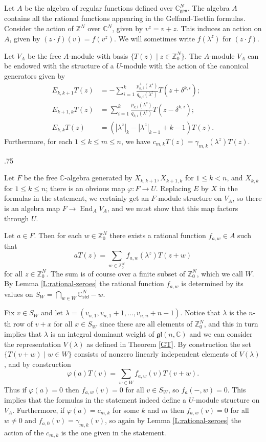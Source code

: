 \documentclass[11pt,fleqn]{article}
\makeatletter
\renewenvironment{proof}[1][\textit{Proof}]{\par
  \pushQED{\qed}%
  \normalfont \topsep.75\paraskip\relax
  \trivlist
  \item[\hskip\labelsep
        \itshape
    #1\@addpunct{.}]\ignorespaces
}{%
  \popQED\endtrivlist\@endpefalse
}
\newcommand\CC{\mathbb C}
\newcommand\ZZ{\mathbb Z}
\renewcommand\to{\longrightarrow}
\renewcommand\phi{\varphi}
\newcommand\gl{\mathfrak{gl}}
\newcommand\gen{\mathsf{gen}}
\newcommand\std{\mathsf{std}}
\DeclareMathOperator\End{End}
\makeatother
\begin{document}
Let $A$ be the algebra of regular functions defined over $\CC^N_\gen$. The 
algebra $A$ contains all the rational functions appearing in the 
Gelfand-Tsetlin formulas. Consider the action of $\ZZ^N$ over $\CC^N$, given 
by $v^z = v+z$. This induces an action on $A$, given by $(z \cdot f)(v) = 
f(v^z)$. We will sometimes write $f(\lambda^z)$ for $(z \cdot f)$. 

\begin{Proposition}
\label{P:universal-generic-GT-module}
Let $V_A$ be the free $A$-module with basis $\{T(z) \mid z \in \ZZ^N_0\}$.
The $A$-module $V_A$ can be endowed with the structure of a $U$-module 
with the action of the canonical generators given by
\begin{align*}
E_{k,k+1} T(z) 
	&= - \sum_{i=1}^k \frac{p^+_{k,i}(\lambda^z)}{q_{k,i}(\lambda^z)} 
		T(z + \delta^{k,i}); \\
E_{k+1,k} T(z) 
	&= \sum_{i=1}^k \frac{p^-_{k,i}(\lambda^z)}{q_{k,i}(\lambda^z)} 
		T(z - \delta^{k,i}); \\
E_{k,k} T(z)
	&= (|\lambda^z|_k - |\lambda^z|_{k-1} + k -1) T(z).
\end{align*}
Furthermore, for each $1 \leq k \leq m \leq n$, we have $c_{m,k} T(z) = 
\gamma_{m,k}(\lambda^z) T(z)$.
\end{Proposition}
\begin{proof}
Let $F$ be the free $\CC$-algebra generated by $X_{k,k+1}, X_{k+1,k}$ for 
$1 \leq k < n$, and $X_{k,k}$ for $1 \leq k \leq n$; there is an obvious map
$\phi: F \to U$. Replacing $E$ by $X$ in the formulas in the statement, we 
certainly get an $F$-module structure on $V_A$, so there is an algebra map $F 
\to \End_A V_A$, and we must show that this map factors through $U$.

Let $a \in F$. Then for each $w \in \ZZ^N_0$ there exists a rational function 
$f_{a,w} \in A$ such that
\[
	aT(z) = \sum_{w \in \ZZ^N_0} f_{a,w}(\lambda^z) T(z+w)
\]
for all $z \in \ZZ^N_0$. The sum is of course over a finite subset of 
$\ZZ^N_0$, which we call $W$. By Lemma \ref{L:rational-zeroes} the rational 
function $f_{a,w}$ is determined by its values on $S_W = \bigcap_{w \in W} 
\CC_\std^N-w$.

Fix $v \in S_W$ and let $\lambda = (v_{n,1}, v_{n,1} + 1, \ldots, v_{n,n} + 
n -1)$. Notice that $\lambda$ is the $n$-th row of $v+x$ for all $x \in S_W$ 
since these are all elements of $\ZZ^N_0$, and this in turn implies that 
$\lambda$ is an integral dominant weight of $\gl(n,\CC)$ and we can
consider the representation $V(\lambda)$ as defined in Theorem \ref{GT}. By 
construction the set $\{T(v+w) \mid w \in W\}$ consists of nonzero linearly 
independent elements of $V(\lambda)$, and by construction
\[
	\phi(a) T(v) = \sum_{w \in W} f_{a,w}(v) T(v+w).
\]
Thus if $\phi(a) = 0$ then $f_{a,w}(v) = 0$ for all $v \in S_W$, so $f_a(-,w) 
= 0$. This implies that the formulas in the statement indeed define a 
$U$-module structure on $V_A$. Furthermore, if $\phi(a) = c_{m,k}$ for
some $k$ and $m$ then $f_{a,w}(v) = 0$ for all $w \neq 0$ and $f_{a,0}(v) = 
\gamma_{m,k}(v)$, so again by Lemma \ref{L:rational-zeroes} the action of the
$c_{m,k}$ is the one given in the statement.
\end{proof}
\end{document}
